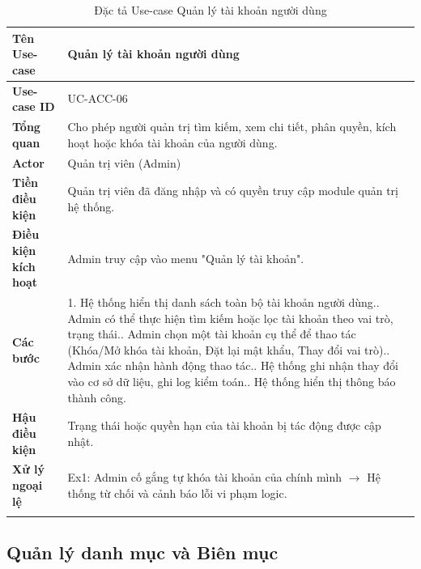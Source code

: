 \newpage
\begin{longtable}{|p{3.5cm}|p{11.5cm}|}
    \hline
    \textbf{Tên Use-case} & \textbf{Quản lý tài khoản người dùng} \\
    \hline
    \textbf{Use-case ID} & UC-ACC-06 \\
    \hline
    \textbf{Tổng quan} & Cho phép người quản trị tìm kiếm, xem chi tiết, phân quyền, kích hoạt hoặc khóa tài khoản của người dùng. \\
    \hline
    \textbf{Actor} & Quản trị viên (Admin) \\
    \hline
    \textbf{Tiền điều kiện} & Quản trị viên đã đăng nhập và có quyền truy cập module quản trị hệ thống. \\
    \hline
    \textbf{Điều kiện kích hoạt} & Admin truy cập vào menu "Quản lý tài khoản". \\
    \hline
    \textbf{Các bước} & 
    1. Hệ thống hiển thị danh sách toàn bộ tài khoản người dùng.\newline
    2. Admin có thể thực hiện tìm kiếm hoặc lọc tài khoản theo vai trò, trạng thái.\newline
    3. Admin chọn một tài khoản cụ thể để thao tác (Khóa/Mở khóa tài khoản, Đặt lại mật khẩu, Thay đổi vai trò).\newline
    4. Admin xác nhận hành động thao tác.\newline
    5. Hệ thống ghi nhận thay đổi vào cơ sở dữ liệu, ghi log kiểm toán.\newline
    6. Hệ thống hiển thị thông báo thành công. \\
    \hline
    \textbf{Hậu điều kiện} & Trạng thái hoặc quyền hạn của tài khoản bị tác động được cập nhật. \\
    \hline
    \textbf{Xử lý ngoại lệ} & 
    Ex1: Admin cố gắng tự khóa tài khoản của chính mình $\rightarrow$ Hệ thống từ chối và cảnh báo lỗi vi phạm logic. \\
    \hline
    \caption{Đặc tả Use-case Quản lý tài khoản người dùng}
\end{longtable}

\subsection{Quản lý danh mục và Biên mục}

